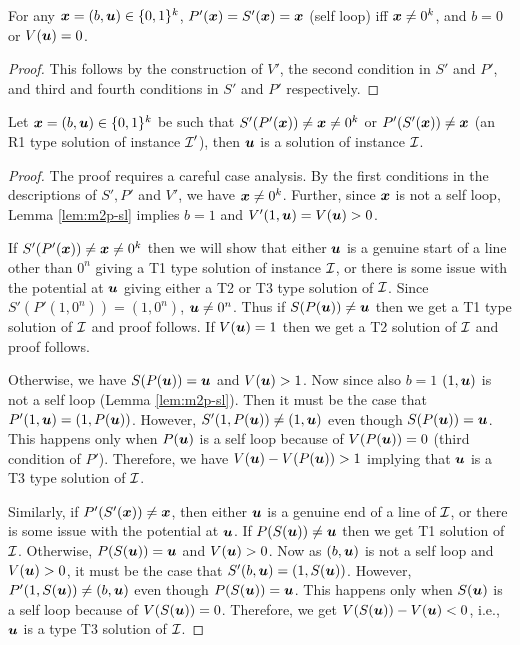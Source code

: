 \begin{lemma}\label{lem:m2p-sl}
For any $\xx=(b,\uu)\in \{0,1\}^k$, $P'(\xx)=S'(\xx)=\xx$ (self loop) iff $\xx\neq 0^k$, and $b=0$ or $V(\uu)=0$.
\end{lemma}
\begin{proof}
This follows by the construction of $V'$, the second condition in $S'$ and $P'$, and third and fourth conditions in $S'$ and $P'$ respectively. 
\end{proof}

\begin{lemma}\label{lem:m2p-r1}
Let $\xx=(b,\uu)\in \{0,1\}^k$ be such that $S'(P'(\xx))\neq \xx \neq 0^k$ or $P'(S'(\xx))\neq \xx$ (an R1 type solution of \EOPL instance $\CI'$), then $\uu$ is a solution of \EOML instance $\CI$.
\end{lemma}
\begin{proof}
The proof requires a careful case analysis. 
By the first conditions in the descriptions of $S',P'$ and $V'$, we have $\xx \neq 0^k$. 
Further, since $\xx$ is not a self loop, Lemma \ref{lem:m2p-sl} implies $b=1$  and $V'(1,\uu)=V(\uu)>0$.
\medskip

If $S'(P'(\xx))\neq \xx\neq 0^k$ then we will show that either $\uu$ is a genuine start of a line other than $0^n$ giving a T1 type solution of \EOML instance $\CI$, or there is some issue with the potential at $\uu$ giving either a T2 or T3 type solution of $\CI$. Since $S'(P'(1,0^n))=(1,0^n)$, $\uu \neq 0^n$. Thus if $S(P(\uu))\neq \uu$ then we get a T1 type solution of $\CI$ and proof follows. If $V(\uu)=1$ then we get a T2 solution of $\CI$ and proof follows. 

Otherwise, we have $S(P(\uu))=\uu$ and $V(\uu)>1$. Now since also $b=1$ $(1,\uu)$ is not a self loop (Lemma \ref{lem:m2p-sl}). %
Then it must be the case that $P'(1,\uu)=(1,P(\uu))$. However, $S'(1,P(\uu))\neq (1,\uu)$ even though $S(P(\uu))=\uu$. This happens only when $P(\uu)$ is a self loop because of $V(P(\uu))=0$ (third condition of $P'$).
Therefore, we have $V(\uu)-V(P(\uu))>1$ implying that $\uu$ is a T3 type solution of $\CI$. 
\medskip

Similarly, if $P'(S'(\xx))\neq \xx$, then either $\uu$ is a genuine end of a line of $\CI$, or there is some issue with the potential at $\uu$. If $P(S(\uu))\neq \uu$ then we get T1 solution of $\CI$. Otherwise, $P(S(\uu))=\uu$ and $V(\uu)>0$. Now as $(b,\uu)$ is not a self loop and $V(\uu)>0$, it must be the case that $S'(b,\uu)=(1,S(\uu))$. However, $P'(1, S(\uu))\neq (b,\uu)$ even though $P(S(\uu))=\uu$. This happens only when $S(\uu)$ is a self loop because of $V(S(\uu))=0$. Therefore, we get $V(S(\uu))-V(\uu)<0$, i.e., $\uu$ is a type T3 solution of $\CI$. 
\end{proof}

